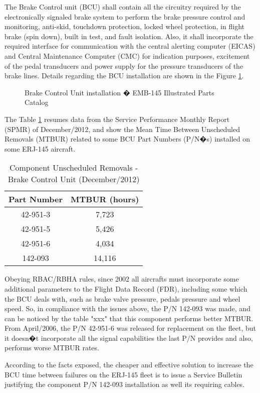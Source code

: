 The Brake Control unit (BCU) shall contain all the circuitry required  by  the electronically  signaled  brake  system  to  perform  the brake pressure control and monitoring,  anti-skid, touchdown protection, locked wheel protection, in flight brake (spin down), built in test,  and fault isolation. Also, it shall incorporate the required interface for communication with the central alerting computer (EICAS) and Central Maintenance Computer (CMC) for indication purposes, excitement of the pedal transducers and power supply for the pressure transducers of the brake lines. Details regarding the BCU installation are shown in the Figure \ref{fig:bcu}.

\begin{figure}[H] %
\caption{Brake Control Unit installation � EMB-145 Illustrated Parts Catalog}
\label{fig:bcu}
\end{figure}

The Table \ref{tab:CUR} resumes data from the Service Performance Monthly Report (SPMR) of December/2012, and show the Mean Time Between Unscheduled Removals (MTBUR) related to some BCU Part Numbers (P/N�s) installed on some ERJ-145 aircraft.


\begin{table}[htbp]
  \centering
  \caption{Component Unscheduled Removals - Brake Control Unit (December/2012)}
    \begin{tabular}{cc}
    \toprule
    Part Number & MTBUR (hours) \\
    \midrule
    42-951-3 & 7,723 \\
    42-951-5 & 5,426 \\
    42-951-6 & 4,034 \\
    142-093 & 14,116 \\
    \bottomrule
    \end{tabular}%
  \label{tab:CUR}%
\end{table}%


Obeying RBAC/RBHA rules, since 2002 all aircrafts must incorporate some additional parameters to the Flight Data Record (FDR), including some which the BCU deals with, such as brake valve pressure, pedals pressure and wheel speed. So, in compliance with the issues above, the P/N 142-093 was made, and can be noticed by the table "xxx" that this component performs better MTBUR. From April/2006, the P/N 42-951-6 was released for replacement on the fleet, but it doesn�t incorporate all the signal capabilities the last P/N provides and also, performs worse MTBUR rates.

According to the facts exposed, the cheaper and effective solution to increase the BCU time between failures on the ERJ-145 fleet is to issue a Service Bulletin justifying the component P/N 142-093 installation as well its requiring cables.
